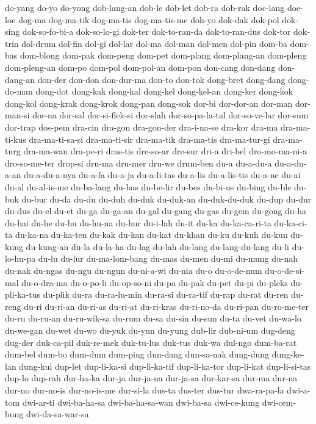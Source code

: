{do-yang do-yo do-yong dob-lang-an dob-le dob-let dob-ra dob-rak doc-lang
doe-loe dog-ma dog-ma-tik dog-ma-tis dog-ma-tis-me doh-yo dok-dak dok-pol
dok-sing dok-so-fo-bi-a dok-so-lo-gi dok-ter dok-to-ran-da dok-to-ran-dus
dok-tor dok-trin dol-drum dol-fin dol-gi dol-lar dol-ma dol-man dol-men
dol-pin dom-ba dom-bas dom-blong dom-pak dom-peng dom-pet dom-plang
dom-plang-an dom-pleng dom-pleng-an dom-po dom-pol dom-pol-an dom-pon
don-cang don-dang don-dang-an don-der don-don don-dur-ma don-to don-tok
dong-bret dong-dang dong-do-man dong-dot dong-kak dong-kal dong-kel
dong-kel-an dong-ker dong-kok dong-kol dong-krak dong-krok dong-pan
dong-sok dor-bi dor-dor-an dor-man dor-man-si dor-na dor-sal
dor-si-flek-si dor-slah dor-so-pa-la-tal dor-so-ve-lar dor-sum dor-trap
dos-pem dra-cin dra-gon dra-gon-der dra-i-na-se dra-kor dra-ma
dra-ma-ti-kus dra-ma-ti-sa-si dra-ma-ti-sir dra-ma-tik dra-ma-tis
dra-ma-tur-gi dra-ma-turg dra-ma-wan dra-pe-ri dras-tis dre-so-ar dre-sur
dri-a dri-bel dro-mo-ma-ni-a dro-so-me-ter drop-si dru-ma dru-mer dru-we
drum-ben du-a du-a-du-a du-a-du-a-an du-a-du-a-nya du-a-fa du-a-ja
du-a-li-tas du-a-lis du-a-lis-tis du-a-ne du-ai du-al du-al-is-me
du-ba-lang du-bas du-be-lir du-bes du-bi-us du-bing du-ble du-buk du-bur
du-da du-du du-duh du-duk du-duk-an du-duk-du-duk du-dup du-dur du-dus
du-el du-et du-ga du-ga-an du-gal du-gang du-gas du-gem du-gong du-ha
du-hai du-he du-hu du-hu-na du-hur du-i-lah du-it du-ka du-ka-ca-ri-ta
du-ka-ci-ta du-ka-na du-ka-ten du-kak du-kan du-kat du-khan du-ku du-kuh
du-kun du-kung du-kung-an du-la du-la-ha du-lag du-lah du-lang
du-lang-du-lang du-li du-lo-hu-pa du-lu du-lur du-ma-lom-bang du-mas
du-men du-mi du-mung du-nah du-nak du-ngas du-ngu du-ngun du-ni-a-wi
du-nia du-o du-o-de-num du-o-de-si-mal du-o-dra-ma du-o-po-li du-op-so-ni
du-pa du-pak du-pet du-pi du-pleks du-pli-ka-tus du-plik du-ra
du-ra-lu-min du-ra-si du-ra-tif du-rap du-rat du-ren du-reng du-ri
du-ri-an du-ri-as du-ri-at du-ri-kras du-ri-no-da du-ri-pan du-ro-me-ter
du-ru du-ru-an du-ru-wik-sa du-rum du-sa du-sin du-sun du-ta du-vet
du-wa-lo du-we-gan du-wet du-wo du-yuk du-yun du-yung dub-lir dub-ni-um
dug-deng dug-der duk-ca-pil duk-re-mek duk-tu-lus duk-tus duk-wa dul-ngo
dum-ba-rat dum-bel dum-bo dum-dum dum-ping dun-dang dun-sa-nak dung-dung
dung-ke-lan dung-kul dup-let dup-li-ka-si dup-li-ka-tif dup-li-ka-tor
dup-li-kat dup-li-si-tas dup-lo dup-rah dur-ha-ka dur-ja dur-ja-na
dur-ja-sa dur-kar-sa dur-ma dur-na dur-no dur-no-is dur-no-is-me dur-si-la
dus-ta dus-ter dus-tur dwa-ra-pa-la dwi-a-tom dwi-ar-ti dwi-ba-ha-sa
dwi-ba-ha-sa-wan dwi-ba-sa dwi-ce-kung dwi-cem-bung dwi-da-sa-war-sa
}
